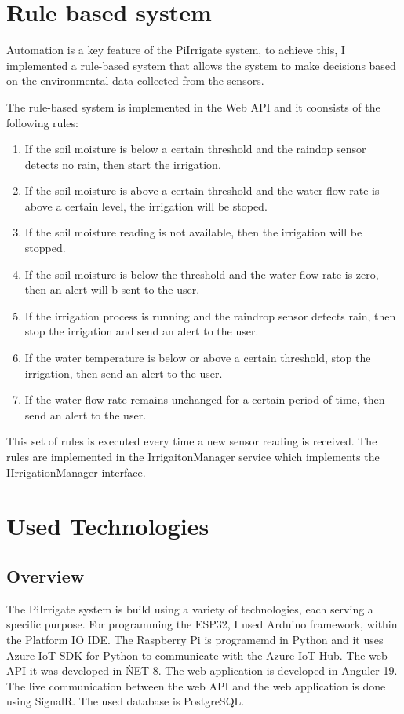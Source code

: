 
\section{Rule based system}
Automation is a key feature of the PiIrrigate system,
to achieve this, I implemented a rule-based system that allows the system
to make decisions based on the environmental data collected from the sensors.

The rule-based system is implemented in the Web API and it coonsists
of the following rules:
\begin{enumerate}
    \item If the soil moisture is below a certain threshold and the raindop sensor detects no rain, then start the irrigation.
    \item If the soil moisture is above a certain threshold and the water flow rate is above a certain level, the irrigation will be stoped.
    \item If the soil moisture reading is not available, then the irrigation will be stopped.
    \item If the soil moisture is below the threshold and the water flow rate is zero, then an alert will b sent to the user.
    \item If the irrigation process is running and the raindrop sensor detects rain, then stop the irrigation and send an alert to the user.
    \item If the water temperature is below or above a certain threshold, stop the irrigation, then send an alert to the user.
    \item If the water flow rate remains unchanged for a certain period of time, then send an alert to the user.
\end{enumerate}
This set of rules is executed every time a new sensor reading is received.
The rules are implemented in the IrrigaitonManager service which implements the IIrrigationManager interface.                                                   

\section{Used Technologies}
\subsection {Overview}
The PiIrrigate system is build using a variety of technologies, each serving a specific purpose. For programming
the ESP32, I used Arduino framework, within the Platform IO IDE. The Raspberry Pi is programemd in Python
and it uses Azure IoT SDK for Python to communicate with the Azure IoT Hub. 
The web API it was developed in \.NET 8. The web application is developed in Anguler 19. The live communication between 
the web API and the web application is done using SignalR. The used database is PostgreSQL.

